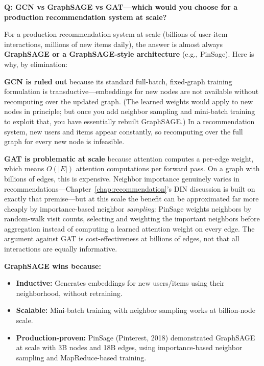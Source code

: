 \begin{interviewq}
\textbf{Q: GCN vs GraphSAGE vs GAT---which would you choose for a production recommendation system at scale?}

 \quad {} \quad \badgefreq{\freqmed}

\stronganswer

For a production recommendation system at scale (billions of user-item interactions, millions of new items daily), the answer is almost always \textbf{GraphSAGE or a GraphSAGE-style architecture} (e.g., PinSage). Here is why, by elimination:

\textbf{GCN is ruled out} because its standard full-batch, fixed-graph training formulation is transductive---embeddings for new nodes are not available without recomputing over the updated graph. (The learned weights would apply to new nodes in principle; but once you add neighbor sampling and mini-batch training to exploit that, you have essentially rebuilt GraphSAGE.) In a recommendation system, new users and items appear constantly, so recomputing over the full graph for every new node is infeasible.

\textbf{GAT is problematic at scale} because attention computes a per-edge weight, which means $O(|E|)$ attention computations per forward pass. On a graph with billions of edges, this is expensive. Neighbor importance genuinely varies in recommendations---Chapter~\ref{chap:recommendation}'s DIN discussion is built on exactly that premise---but at this scale the benefit can be approximated far more cheaply by importance-based neighbor \textit{sampling}: PinSage weights neighbors by random-walk visit counts, selecting and weighting the important neighbors before aggregation instead of computing a learned attention weight on every edge. The argument against GAT is cost-effectiveness at billions of edges, not that all interactions are equally informative.

\textbf{GraphSAGE wins because:}
\begin{itemize}
    \item \textbf{Inductive:} Generates embeddings for new users/items using their neighborhood, without retraining.
    \item \textbf{Scalable:} Mini-batch training with neighbor sampling works at billion-node scale.
    \item \textbf{Production-proven:} PinSage (Pinterest, 2018) demonstrated GraphSAGE at scale with 3B nodes and 18B edges, using importance-based neighbor sampling and MapReduce-based training.
\end{itemize}


\end{interviewq}
